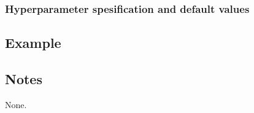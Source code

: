 \documentclass[a4paper,11pt]{article}
\begin{document}
\subsubsection*{Hyperparameter spesification and default values}




\subsection*{Example}



\subsection*{Notes}

None.
\end{document}
